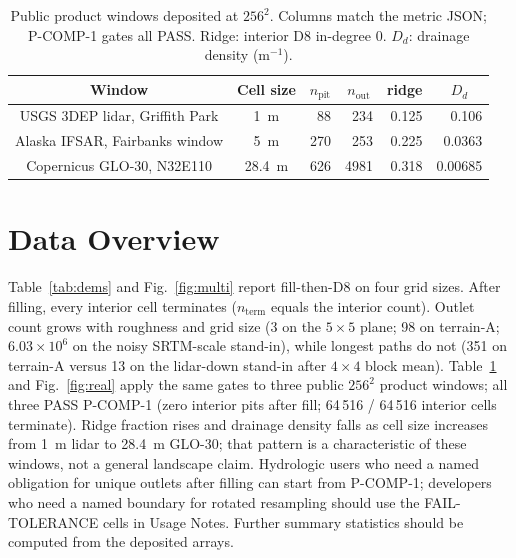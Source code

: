 \documentclass[11pt,a4paper]{article}
\newcommand{\thead}[1]{\multicolumn{1}{c}{#1}}
\begin{document}
\begin{table}[!htbp]
\centering
\caption{Public product windows deposited at $256^{2}$. Columns match the
metric JSON; P-COMP-1 gates all PASS. Ridge: interior D8 in-degree 0.
$D_d$: drainage density (m$^{-1}$).}
\label{tab:real}
\begin{tabular}{ccrrrr}
\toprule
\thead{Window} & \thead{Cell size} & \thead{$n_{\mathrm{pit}}$} &
\thead{$n_{\mathrm{out}}$} & \thead{ridge} & \thead{$D_d$} \\
\midrule
USGS 3DEP lidar, Griffith Park & 1~m & 88 & 234 & 0.125 & 0.106 \\
Alaska IFSAR, Fairbanks window & 5~m & 270 & 253 & 0.225 & 0.0363 \\
Copernicus GLO-30, N32E110 & 28.4~m & 626 & 4981 & 0.318 & 0.00685 \\
\bottomrule
\end{tabular}
\end{table}

\section{Data Overview}

Table~\ref*{tab:dems} and Fig.~\ref*{fig:multi} report fill-then-D8 on
four grid sizes. After filling, every interior cell terminates
($n_{\mathrm{term}}$ equals the interior count). Outlet count grows with
roughness and grid size (3 on the $5\times5$ plane; 98 on terrain-A;
$6.03\times10^{6}$ on the noisy SRTM-scale stand-in), while longest paths
do not (351 on terrain-A versus 13 on the lidar-down stand-in after
$4\times4$ block mean). Table~\ref*{tab:real} and Fig.~\ref*{fig:real}
apply the same gates to three public $256^{2}$ product windows; all three
PASS P-COMP-1 (zero interior pits after fill; 64\,516 / 64\,516 interior
cells terminate). Ridge fraction rises and drainage density falls as cell
size increases from 1~m lidar to 28.4~m GLO-30; that pattern is a
characteristic of these windows, not a general landscape claim.
Hydrologic users who need a named obligation for unique outlets after
filling can start from P-COMP-1; developers who need a named boundary for
rotated resampling should use the FAIL-TOLERANCE cells in Usage Notes.
Further summary statistics should be computed from the deposited arrays.
\end{document}
